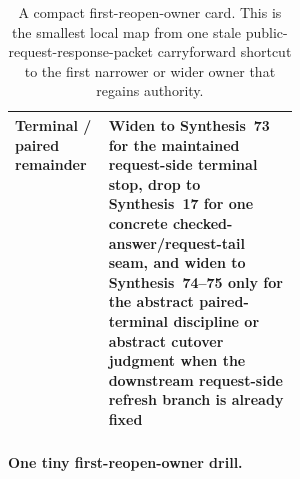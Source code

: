 \documentclass[11pt]{article}
\begin{document}
\begin{table}[t]
\begin{tabularx}{0.98\linewidth}{@{}p{0.33\linewidth}X@{}}
Terminal / paired remainder & Widen to \textbf{Synthesis~73} for the maintained request-side terminal stop, drop to \textbf{Synthesis~17} for one concrete checked-answer/request-tail seam, and widen to \textbf{Synthesis~74--75} only for the abstract paired-terminal discipline or abstract cutover judgment when the downstream request-side refresh branch is already fixed \\
\bottomrule
\end{tabularx}
\caption{A compact first-reopen-owner card. This is the smallest local map from one stale public-request-response-packet carryforward shortcut to the first narrower or wider owner that regains authority.}
\label{tab:first-reopen-owner-card-public-request-response-packet-carryforward}
\end{table}

\paragraph{One tiny first-reopen-owner drill.}
\end{document}
